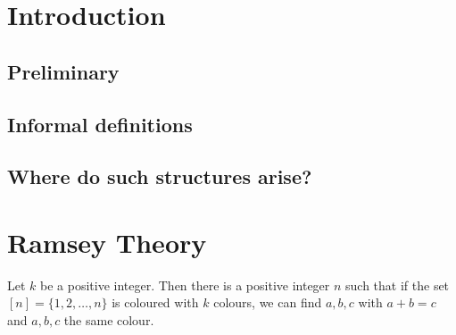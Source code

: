 \documentclass{article}
\begin{document}
\maketitle



\clearpage
\section{Introduction}
\subsection{Preliminary}

\subsection{Informal definitions}



\subsection{Where do such structures arise?}

\clearpage
\section{Ramsey Theory}








\label{def:triangle}



\begin{thm}
    Let $k$ be a positive integer. Then there is a positive integer $n$ such that if the set $[n] = \{1, 2, \dots, n\}$ is coloured with $k$ colours, we can find $a, b, c$ with $a + b = c$ and $a,b,c$ the same colour.
\end{thm}
\end{document}
